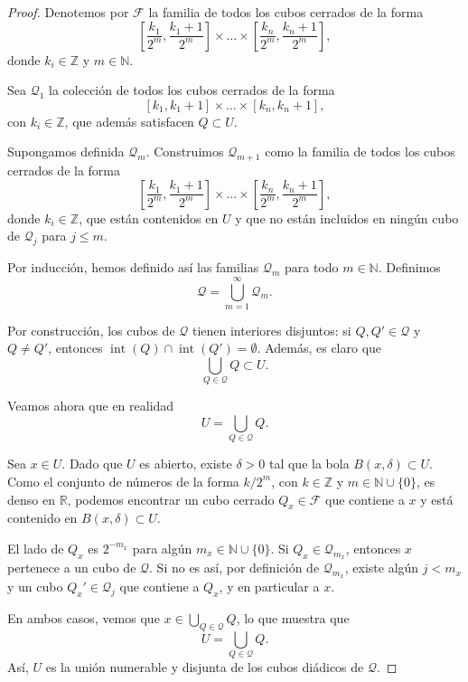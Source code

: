 \begin{proof}
    Denotemos por $\mathcal{F}$ la familia de todos los cubos cerrados de la forma
    \[
        \left[\frac{k_1}{2^m}, \frac{k_1 + 1}{2^m}\right] \times \dots \times \left[\frac{k_n}{2^m}, \frac{k_n + 1}{2^m}\right],
    \]
    donde $k_i \in \mathbb{Z}$ y $m \in \mathbb{N}$.  
    
    Sea $\mathcal{Q}_1$ la colección de todos los cubos cerrados de la forma
    \[
        [k_1, k_1 + 1] \times \dots \times [k_n, k_n + 1],
    \]
    con $k_i \in \mathbb{Z}$, que además satisfacen $Q \subset U$.  
    
    Supongamos definida $\mathcal{Q}_m$. Construimos $\mathcal{Q}_{m+1}$ como la familia de todos los cubos cerrados de la forma
    \[
        \left[\frac{k_1}{2^{m}}, \frac{k_1+1}{2^{m}}\right] \times \dots \times \left[\frac{k_n}{2^{m}}, \frac{k_n+1}{2^{m}}\right],
    \]
    donde $k_i \in \mathbb{Z}$, que están contenidos en $U$ y que no están incluidos en ningún cubo de $\mathcal{Q}_j$ para $j \leq m$.  
    
    Por inducción, hemos definido así las familias $\mathcal{Q}_m$ para todo $m \in \mathbb{N}$. Definimos
    \[
        \mathcal{Q} = \bigcup_{m=1}^{\infty} \mathcal{Q}_m.
    \]
    
    Por construcción, los cubos de $\mathcal{Q}$ tienen interiores disjuntos: si $Q, Q' \in \mathcal{Q}$ y $Q \neq Q'$, entonces $\operatorname{int}(Q) \cap \operatorname{int}(Q') = \emptyset$. Además, es claro que
    \[
        \bigcup_{Q \in \mathcal{Q}} Q \subset U.
    \]
    
    Veamos ahora que en realidad
    \[
        U = \bigcup_{Q \in \mathcal{Q}} Q.
    \]
    
    Sea $x \in U$. Dado que $U$ es abierto, existe $\delta > 0$ tal que la bola $B(x, \delta) \subset U$. Como el conjunto de números de la forma $k/2^m$, con $k \in \mathbb{Z}$ y $m \in \mathbb{N} \cup \{0\}$, es denso en $\mathbb{R}$, podemos encontrar un cubo cerrado $Q_x \in \mathcal{F}$ que contiene a $x$ y está contenido en $B(x, \delta) \subset U$.  
    
    El lado de $Q_x$ es $2^{-m_x}$ para algún $m_x \in \mathbb{N} \cup \{0\}$. Si $Q_x \in \mathcal{Q}_{m_x}$, entonces $x$ pertenece a un cubo de $\mathcal{Q}$. Si no es así, por definición de $\mathcal{Q}_{m_x}$, existe algún $j < m_x$ y un cubo $Q_x' \in \mathcal{Q}_j$ que contiene a $Q_x$, y en particular a $x$.  
    
    En ambos casos, vemos que $x \in \bigcup_{Q \in \mathcal{Q}} Q$, lo que muestra que
    \[
        U = \bigcup_{Q \in \mathcal{Q}} Q.
    \]
    Así, $U$ es la unión numerable y disjunta de los cubos diádicos de $\mathcal{Q}$.
    \end{proof}
    
